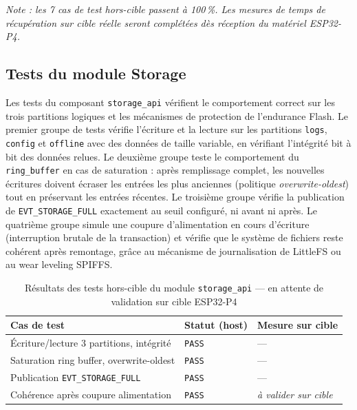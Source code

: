 \noindent\textit{Note : les 7 cas de test hors-cible passent à 100\,\%.
Les mesures de temps de récupération sur cible réelle seront complétées
dès réception du matériel ESP32-P4.}

\subsection{Tests du module Storage}
\label{subsec:t_storage}

Les tests du composant \texttt{storage\_api} vérifient le comportement
correct sur les trois partitions logiques et les mécanismes de
protection de l'endurance Flash. Le premier groupe de tests vérifie
l'écriture et la lecture sur les partitions \texttt{logs},
\texttt{config} et \texttt{offline} avec des données de taille
variable, en vérifiant l'intégrité bit à bit des données relues.
Le deuxième groupe teste le comportement du \texttt{ring\_buffer} en
cas de saturation : après remplissage complet, les nouvelles écritures
doivent écraser les entrées les plus anciennes (politique
\textit{overwrite-oldest}) tout en préservant les entrées récentes.
Le troisième groupe vérifie la publication de \texttt{EVT\_STORAGE\_FULL}
exactement au seuil configuré, ni avant ni après. Le quatrième groupe
simule une coupure d'alimentation en cours d'écriture (interruption
brutale de la transaction) et vérifie que le système de fichiers reste
cohérent après remontage, grâce au mécanisme de journalisation de
LittleFS ou au wear leveling SPIFFS.

\begin{table}[H]
\centering
\renewcommand{\arraystretch}{1.5}
\caption{Résultats des tests hors-cible du module \texttt{storage\_api} — en attente de validation sur cible ESP32-P4}
\label{tab:res_storage}
\small
\begin{tabular}{|p{5.5cm}|p{2.2cm}|p{3.8cm}|}
\hline
\rowcolor{gray!20}
\textbf{Cas de test} & \textbf{Statut (host)} & \textbf{Mesure sur cible} \\
\hline
Écriture/lecture 3 partitions, intégrité & \texttt{PASS} & — \\
\hline
Saturation ring buffer, overwrite-oldest  & \texttt{PASS} & — \\
\hline
Publication \texttt{EVT\_STORAGE\_FULL}   & \texttt{PASS} & — \\
\hline
Cohérence après coupure alimentation      & \texttt{PASS} & \textit{à valider sur cible} \\
\hline
\end{tabular}
\end{table}

